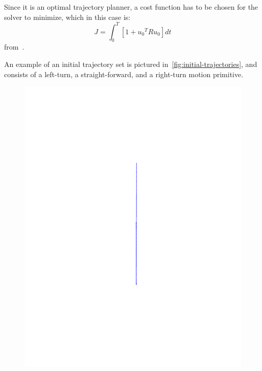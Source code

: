 Since it is an optimal trajectory planner, a cost function has to be chosen for
the solver to minimize, which in this case is:
\begin{equation}
  J = \int_{0}^{T} \left[ 1 + {u_{0}}^{T}Ru_{0} \right] dt
\end{equation}
from~\cite{majumdarFunnelLibrariesRealtime2017}.

An example of an initial trajectory set is pictured
in~\ref{fig:initial-trajectories}, and consists of a left-turn, a
straight-forward, and a right-turn motion primitive.

\begin{figure}
  \centering
  \begin{minipage}[b]{0.2\textwidth}
    \includegraphics[width=\textwidth]{figures/method/straight-trajector}
  \end{minipage}
  \hfill
  \begin{minipage}[b]{0.2\textwidth}

\end{minipage}
\end{figure}

